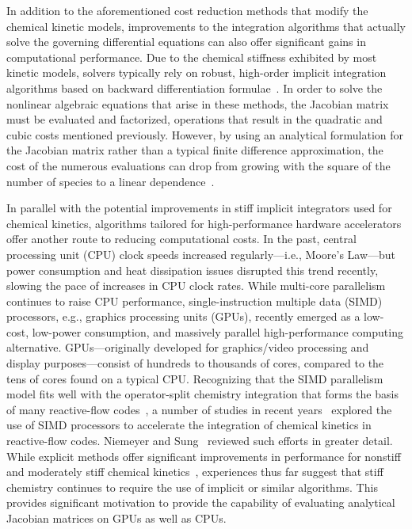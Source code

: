 \documentclass[preprint,12pt]{elsarticle}
\begin{document}
In addition to the aforementioned cost reduction methods that modify the chemical kinetic models, improvements to the integration algorithms that actually solve the governing differential equations can also offer significant gains in computational performance.
Due to the chemical stiffness exhibited by most kinetic models, solvers typically rely on robust, high-order implicit integration algorithms based on backward differentiation formulae~\cite{Curtiss:1952,Byrne:1987wp,Brown:1989vl,Hindmarsh:2005hg}.
In order to solve the nonlinear algebraic equations that arise in these methods, the Jacobian matrix must be evaluated and factorized, operations that result in the quadratic and cubic costs mentioned previously.
However, by using an analytical formulation for the Jacobian matrix rather than a typical finite difference approximation, the cost of the numerous evaluations can drop from growing with the square of the number of species to a linear dependence~\cite{Lu:2009gh}.

In parallel with the potential improvements in stiff implicit integrators used for chemical kinetics, algorithms tailored for high-performance hardware accelerators offer another route to reducing computational costs.
In the past, central processing unit (CPU) clock speeds increased regularly---i.e., Moore's Law---but power consumption and heat dissipation issues disrupted this trend recently, slowing the pace of increases in CPU clock rates.
While multi-core parallelism continues to raise CPU performance, single-instruction multiple data (SIMD) processors, e.g., graphics processing units (GPUs), recently emerged as a low-cost, low-power consumption, and massively parallel high-performance computing alternative.
GPUs---originally developed for graphics\slash video processing and display purposes---consist of hundreds to thousands of cores, compared to the tens of cores found on a typical CPU.
Recognizing that the SIMD parallelism model fits well with the operator-split chemistry integration that forms the basis of many reactive-flow codes~\cite{Oran:2001aa}, a number of studies in recent years~\cite{Spafford:2010aa,Shi:2011aa,Niemeyer:2011aa,Shi:2012aa,Stone:2013aa,Niemeyer:2014aa} explored the use of SIMD processors to accelerate the integration of chemical kinetics in reactive-flow codes.
Niemeyer and Sung~\cite{Niemeyer:2014ab} reviewed such efforts in greater detail.
While explicit methods offer significant improvements in performance for nonstiff and moderately stiff chemical kinetics~\cite{Niemeyer:2014aa}, experiences thus far suggest that stiff chemistry continues to require the use of implicit or similar algorithms.
This provides significant motivation to provide the capability of evaluating analytical Jacobian matrices on GPUs as well as CPUs.
\end{document}
